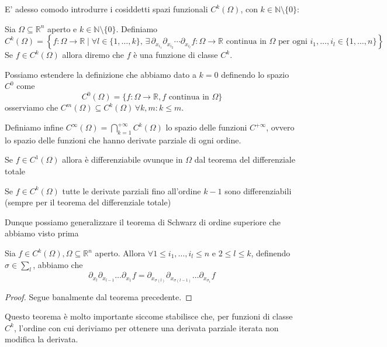 E' adesso comodo introdurre i cosiddetti spazi funzionali $C^k(\Omega)$, con $k \in \mathbb{N} \setminus \{ 0 \}$:
\begin{definition}[spazio $C^k$]
Sia $\Omega \subseteq \mathbb{R}^n$ aperto e $k \in \mathbb{N} \setminus \{ 0 \}$. Definiamo
$$
C^k(\Omega) = \left\{ f: \Omega \to \mathbb{R} \mid \forall l \in \{1, \ldots, k\}, \, \exists \, \partial_{x_{i_1}} \partial_{x_{i_2}} \cdots \partial_{x_{i_l}} f: \Omega \to \mathbb{R} \text{ continua in } \Omega \text{ per ogni } i_1, \ldots, i_l \in \{1, \ldots, n\} \right\}
$$
Se $f \in C^{k}(\Omega)$ allora diremo che $f$ è una funzione di classe $C^k$.
\end{definition}
\begin{remark}
Possiamo estendere la definizione che abbiamo dato a $k=0$ definendo lo spazio $C^{0}$ come
$$
C^{0}(\Omega) = \{f: \Omega \to \mathbb{R}, f \text{ continua in } \Omega \}
$$
osserviamo che $C^{m}(\Omega) \subseteq C^{k}(\Omega) \, \forall k, m : k \leq m$.
\end{remark}
Definiamo infine $C^{\infty}(\Omega) = \bigcap\limits^{+\infty}_{k=1} C^{k}(\Omega)$ lo spazio delle funzioni $C^{+\infty}$, ovvero lo spazio delle funzioni che hanno derivate parziale di ogni ordine.
\begin{remark}
Se $f \in C^1 (\Omega)$ allora è differenziabile ovunque in $\Omega$ dal teorema del differenziale totale
\end{remark}
\begin{remark}
Se $f \in C^{k} (\Omega)$ tutte le derivate parziali fino all'ordine $k-1$ sono differenziabili (sempre per il teorema del differenziale totale)
\end{remark}
Dunque possiamo generalizzare il teorema di Schwarz di ordine superiore che abbiamo visto prima
\begin{theorem}
Sia $f \in C^k(\Omega), \Omega \subseteq \mathbb{R}^n$ aperto. Allora $\forall 1 \leq i_1, \ldots, i_l \leq n$ e $2 \leq l \leq k$, definendo $\sigma \in \sum_{l}$, abbiamo che
$$
\partial_{x_l} \partial_{x_{l-1}} \ldots \partial_{x_1} f = \partial_{x_{\sigma(l)}} \partial_{x_{\sigma(l-1)}} \ldots \partial_{x_{\sigma_{1}}} f
$$
\end{theorem}
\begin{proof}
Segue banalmente dal teorema precedente.
\end{proof}
Questo teorema è molto importante siccome stabilisce che, per funzioni di classe $C^k$, l'ordine con cui deriviamo per ottenere una derivata parziale iterata non modifica la derivata. \\
